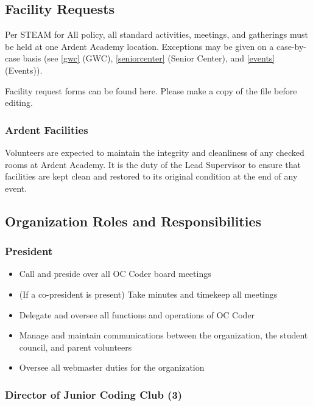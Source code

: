 \documentclass[twoside,11pt,letterpaper,abstracton]{scrartcl}
\begin{document}
\subsection{Facility Requests}

Per STEAM for All policy, all standard activities, meetings, and gatherings must be held at one Ardent Academy location. Exceptions may be given on a case-by-case basis (see \cref{gwc} (GWC), \cref{seniorcenter} (Senior Center), and \cref{events} (Events)).

Facility request forms can be found here. Please make a copy of the file before editing.

\subsubsection{Ardent Facilities}

Volunteers are expected to maintain the integrity and cleanliness of any checked rooms at Ardent Academy. It is the duty of the Lead Supervisor to ensure that facilities are kept clean and restored to its original condition at the end of any event.

\subsection{Organization Roles and Responsibilities}

\subsubsection{President}

\begin{itemize}
    \item Call and preside over all OC Coder board meetings
    \item (If a co-president is present) Take minutes and timekeep all meetings
    \item Delegate and oversee all functions and operations of OC Coder
    \item Manage and maintain communications between the organization, the student council, and parent volunteers
    \item Oversee all webmaster duties for the organization
\end{itemize}

\subsubsection{Director of Junior Coding Club (3)}
\end{document}
